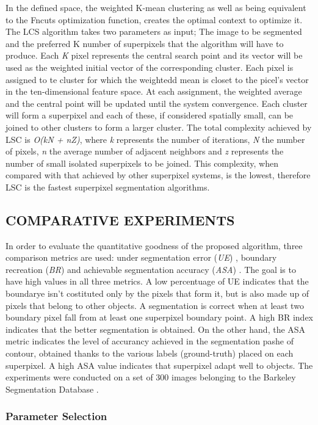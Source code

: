 In the defined space, the weighted K-mean clustering as well as being 
equivalent to the Fncuts optimization function, creates the optimal context to 
optimize it. The LCS algorithm takes two parameters as input; The image 
to be segmented and the preferred K number of superpixels that the 
algorithm will have to produce. Each \emph{K} pixel represents the central search point 
and its vector will be used as the weighted initial vector of the corresponding 
cluster. Each pixel is assigned to te cluster for which the weightedd mean 
is closet to the picel's vector in the ten-dimensional feature space. At each 
assignment, the weighted average and the central point will be updated until 
the system convergence. Each cluster will form a superpixel and each of 
these, if considered spatially small, can be joined to other clusters to form 
a larger cluster. The total complexity achieved by LSC is \emph{O(kN + nZ)}, where 
\emph{k} represents the number of iterations, \emph{N} the number of pixels, \emph{n} the average 
number of adjacent neighbors and \emph{z} represents the number of small 
isolated superpixels to be joined. This complexity, when compared with that 
achieved by other superpixel systems, is the lowest, therefore LSC is the 
fastest superpixel segmentation algorithms.

\subsection{COMPARATIVE EXPERIMENTS}
In order to evaluate the quantitative goodness of the proposed algorithm, 
three comparison metrics are used: under segmentation error (\emph{UE}) \cite{0781426514}, boundary 
recreation (\emph{BR}) and achievable segmentation accuracy (\emph{ASA}) \cite{0781426508}. The goal 
is to have high values in all three metrics. A low percentuage of UE indicates 
that the boundarye isn't costituted only by the pixels that form it, but is 
also made up of pixels that belong to other objects. A segmentation is correct 
when at least two boundary pixel fall from at least one superpixel boundary 
point. A high BR index indicates that the better segmentation is obtained. 
On the other hand, the ASA metric indicates the level of accurancy achieved 
in the segmentation pashe of contour, obtained thanks to the various labels 
(ground-truth) placed on each superpixel. A high ASA value indicates that 
superpixel adapt well to objects. The experiments were conducted on a set 
of 300 images belonging to the Barkeley Segmentation Database \cite{0781426515}.

\subsubsection{Parameter Selection}
